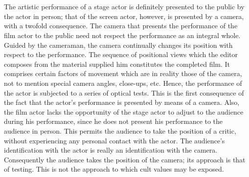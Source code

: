 \documentclass[11pt, letterpaper]{article}
\begin{document}
\section{}

The artistic performance of a stage actor is definitely presented to the public
by the actor in person; that of the screen actor, however, is presented by a
camera, with a twofold consequence. The camera that presents the performance of
the film actor to the public need not respect the performance as an integral
whole. Guided by the cameraman, the camera continually changes its position
with respect to the performance. The sequence of positional views which the
editor composes from the material supplied him constitutes the completed film.
It comprises certain factors of movement which are in reality those of the
camera, not to mention special camera angles, close-ups, etc. Hence, the
performance of the actor is subjected to a series of optical tests. This is the
first consequence of the fact that the actor’s performance is presented by
means of a camera. Also, the film actor lacks the opportunity of the stage
actor to adjust to the audience during his performance, since he does not
present his performance to the audience in person. This permits the audience to
take the position of a critic, without experiencing any personal contact with
the actor. The audience’s identification with the actor is really an
identification with the camera. Consequently the audience takes the position of
the camera; its approach is that of testing. This is not the approach to which
cult values may be exposed.

\section{}
\end{document}

